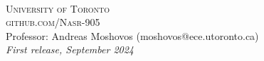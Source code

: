 \documentclass[openany,11pt,fleqn]{book} %
\begin{document}

\newpage
~\vfill
\thispagestyle{empty}


\noindent\textsc{University of Toronto}\\

\noindent \textsc{github.com/Nasr-905}\\ %

\noindent Professor: Andreas Moshovos (moshovos@ece.utoronto.ca)\\ %

\noindent \textit{First release, September 2024} %



\pagestyle{empty} %

\tableofcontents %


\pagestyle{fancy} %

% 



% 

% 

% 

% 
\end{document}
